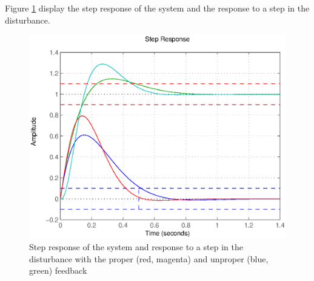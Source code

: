 Figure \ref{designProperFy} display the step response of the system and the response to a step in the disturbance.

\begin{figure}[h!t]
    \centering
    \includegraphics[width=\linewidth]{fig/designProperFy.eps}
    \caption{Step response of the system and response to a step in the disturbance with the proper (red, magenta) and unproper (blue, green) feedback}
    \label{designProperFy}
\end{figure}
